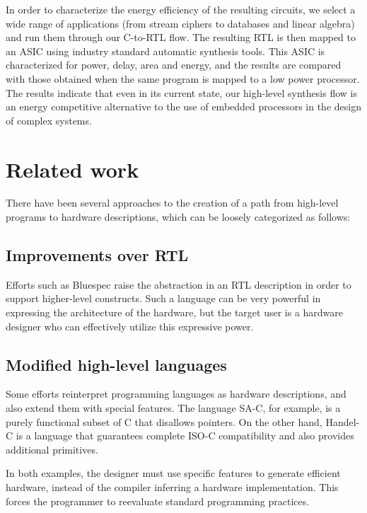 \documentclass[conference]{IEEEtran}
\begin{document}
In order to characterize the energy efficiency of the resulting
circuits, we select a wide range of applications (from stream ciphers
to databases and linear algebra) and run them through our C-to-RTL
flow. The resulting RTL is then mapped to an ASIC using industry
standard automatic synthesis tools. This ASIC is characterized for
power, delay, area and energy, and the results are compared with those
obtained when the same program is mapped to a low power processor.
The results indicate that even in its current state, our high-level
synthesis flow is an energy competitive alternative to the use of
embedded processors in the design of complex systems.


\section{Related work}

There have been several approaches to the creation of a path from 
high-level programs to hardware descriptions, which
can be loosely categorized as follows:

\subsection{Improvements over RTL}

Efforts such as Bluespec\cite{bluespec-memo} raise the abstraction in an
RTL description in order to support higher-level constructs. Such a
language can be very powerful in expressing the architecture of the
hardware, but the target user is a hardware designer who can
effectively utilize this expressive power.

\subsection{Modified high-level languages}

Some efforts reinterpret programming languages as hardware
descriptions, and also extend them with special features. The language
SA-C\cite{SA-C}, for example, is a purely
functional subset of C that disallows pointers. On the other hand,
Handel-C\cite{handel-c} is a language that guarantees complete ISO-C
compatibility and also provides additional primitives.

In both examples, the designer must use specific features to generate
efficient hardware, instead of the compiler inferring a hardware
implementation. This forces the programmer to reevaluate standard
programming practices.
\end{document}
